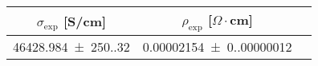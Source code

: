 \begin{tabular}{ccc}
\toprule
$\sigma_{\exp}$ [S/cm] & $\rho_{\exp}$ [$\Omega  \cdot$cm] \\
\midrule
\num{46428.984(250.320)} & \num{0.00002154(0.00000012)} \\
\bottomrule
\end{tabular}
